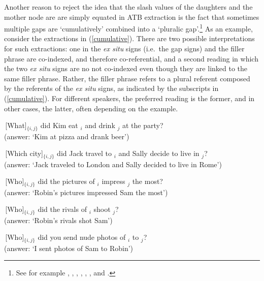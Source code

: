 \documentclass[output=paper]{langsci/langscibook}
\begin{document}
Another reason to reject the idea that  the {\sc slash} values of the daughters and the mother node are are simply equated in ATB extraction is the fact that sometimes multiple gaps are `cumulatively' combined into a `pluralic gap'.\footnote{See for example  \citet{munn98atb,munn99atb},  \citet[136,160]{postal98},
    \citet[125]{kehler},
 \citet{gawronkehlersalt}, 
 \citet{zhang}, \citet{chavessubjexp}, and \citet{Vicente2016-NELS46}.}
As an example, consider the extractions in (\ref{cumulative}). There are two possible interpretations
for such extractions: one in the {\it ex situ} signs (i.e.\ the gap signs) and the filler phrase are co-indexed, and therefore co-referential, and a second reading in which the two {\it ex situ} signs are no not co-indexed even though they are linked to the same filler phrase.  Rather, the filler phrase refers to a plural
 referent composed by the referents of the {\it ex situ} signs, as indicated by the subscripts 
in (\ref{cumulative}). For different speakers, the preferred reading is the former, and in other cases,
the latter, often depending on the example.

\ea \label{cumulative}
\ea
\,[What]$_{\lbrace i,j \rbrace}$ did Kim eat \spc$_i$ and drink \spc$_j$ at the party?\\
(answer: `Kim at pizza and drank beer')
\item \,[Which city]$_{\lbrace i,j \rbrace}$ did Jack travel to \spc$_i$ and Sally decide to live in \spc$_j$?\\
(answer: `Jack traveled to London and Sally decided to live in Rome')
\item \,[Who]$_{\lbrace i,j \rbrace}$ did the pictures of \spc$_i$ impress \spc$_j$ the most?\\
(answer: `Robin's pictures impressed Sam the most')
\item \,[Who]$_{\lbrace i,j \rbrace}$ did the rivals of \spc$_i$ shoot \spc$_j$?\\
(answer: `Robin's rivals shot Sam')
\item \,[Who]$_{\lbrace i,j \rbrace}$ did you send nude photos of \spc$_i$ to \spc$_j$?\\
(answer: `I sent photos of Sam to Robin')
\z
\z
\end{document}
